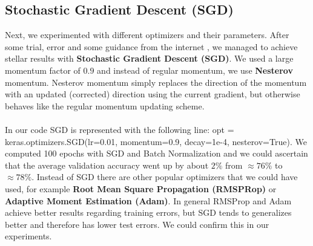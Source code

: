 \documentclass{article}
\begin{document}
	
	\subsection{Stochastic Gradient Descent (SGD)}
	\label{subsec:StochasticGradientDescent}
	Next, we experimented with different optimizers and their parameters. After some trial, error and some guidance from the internet \cite{Ruder2016SGD}, we managed to achieve stellar results with \textbf{Stochastic Gradient Descent (SGD)}. We used a large momentum factor of $0.9$ and instead of regular momentum, we use \textbf{Nesterov} momentum. Nesterov momentum simply replaces the direction of the momentum with an updated (corrected) direction using the current gradient, but otherwise behaves like the regular momentum updating scheme.\\
	\\
	In our code SGD is represented with the following line: opt = keras.optimizers.SGD(lr=0.01, momentum=0.9, decay=1e-4, nesterov=True). We computed 100 epochs with SGD and Batch Normalization and we could ascertain that the average validation accuracy went up by about $2\%$ from $\approx 76\%$ to $\approx 78\%$. Instead of SGD there are other popular optimizers that we could have used, for example \textbf{Root Mean Square Propagation (RMSPRop)} or \textbf{Adaptive Moment Estimation (Adam)}. In general RMSProp and Adam achieve better results regarding training errors, but SGD tends to generalizes better and therefore has lower test errors. We could confirm this in our experiments.
	
\end{document}
